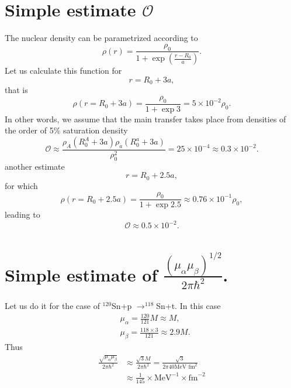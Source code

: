 \documentclass[a4paper,14pt]{article}
\begin{document}
\section{Simple estimate $\mathcal{O}$}
The nuclear density can be parametrized according to
\begin{equation}\label{eq_est_35}
\rho(r)=\frac{\rho_0}{1+\exp\left(\frac{r-R_0}{a}\right)}.
\end{equation}
Let us calculate this function for 
\begin{equation}\label{eq_est_36}
r=R_0+3a,
\end{equation}
that is 
\begin{equation}\label{eq_est_37}
\rho(r=R_0+3a)=\frac{\rho_0}{1+\exp 3}=5\times 10^{-2}\rho_0.
\end{equation}
In other words, we assume that the main transfer takes place from densities of the order of 5\% saturation density
\begin{equation}\label{eq_est_38}
\mathcal{O}\approx \frac{\rho_A(R_0^A+3a)\rho_a(R_0^a+3a)}{\rho_0^2}=25\times 10^{-4}\approx 0.3 \times 10^{-2}.
\end{equation}
another estimate 
\begin{equation}\label{eq_est_39}
r=R_0+2.5a,
\end{equation}
for which
\begin{equation}\label{eq_est_40}
\rho(r=R_0+2.5a)=\frac{\rho_0}{1+\exp 2.5}\approx 0.76\times 10^{-1}\rho_0,
\end{equation}
leading to 
\begin{equation}\label{eq_est_41}
\mathcal{O}\approx 0.5 \times 10^{-2}.
\end{equation}
\section{Simple estimate of $\frac{(\mu_\alpha \mu_\beta)^{1/2}}{2\pi\hbar^2}$.}
Let us do it for the case of $^{120}$Sn+p $\longrightarrow ^{118}$Sn+t. In this case
\begin{equation}\label{eq_est_42}
\begin{split}
&\mu_\alpha=\frac{120}{121}M\approx M,\\
&\mu_\beta=\frac{118\times  3}{121} \approx 2.9 M.
\end{split}
\end{equation}
Thus
\begin{equation}\label{eq_est_43}
\begin{split}
\frac{\sqrt{\mu_\alpha\mu_\beta}}{2\pi\hbar^2}&\approx \frac{\sqrt{3}M}{2\pi\hbar^2}=\frac{\sqrt{3}}{2\pi 40 \text{MeV fm}^2}\\
&\approx \frac{1}{145}\times \text{MeV}^{-1}\times \text{fm}^{-2}
\end{split}
\end{equation}
\end{document}
